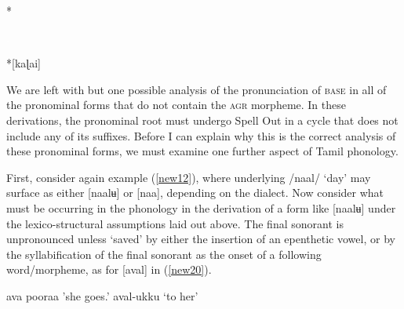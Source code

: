 \documentclass[output=paper,colorlinks,citecolor=brown,
]{langscibook}
\begin{document}
\begin{multicols}{3}
\begin{exe}
\ex \label{new19} *

\vfill \null
\columnbreak
 {\textcolor{white}{.}} \\
\rightarrow 
 
\vfill \null
\columnbreak

*[kaɭai]

\end{exe}
\end{multicols}

We are left with but one possible analysis of the pronunciation of \textsc{base} in all of the pronominal forms that do not contain the \textsc{agr} morpheme. In these derivations, the pronominal root must undergo Spell Out in a cycle that does not include any of its suffixes. Before I can explain why this is the correct analysis of these pronominal forms, we must examine one further aspect of Tamil phonology. 

First, consider again example (\ref{new12}), where underlying /naal/ ‘day’ may surface as either  [naalʉ] or [naa], depending on the dialect. Now consider what must be occurring in the phonology in the derivation of a form like [naalʉ] under the lexico-structural assumptions laid out above. The final sonorant is unpronounced unless ‘saved’ by either the insertion of an epenthetic vowel, or by the syllabification of the final sonorant as the onset of a following word/morpheme, as for [aval] in (\ref{new20}).

\begin{exe}
\ex \label{new20}
\begin{xlist}
\ex \label{new20a}
ava pooraa	\hspace{1.8cm}	'she goes.' 
\ex \label{new20b}
aval-ukku 	\hspace{2cm}	‘to her' 
\end{xlist}
\end{exe}
\end{document}
